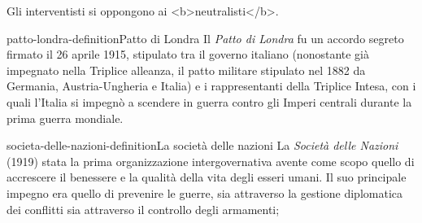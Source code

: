 \documentclass[preview]{standalone}
\begin{document}
\begin{plainhtml}
    Gli interventisti si oppongono ai <b>neutralisti</b>.
\end{plainhtml}

\begin{snippetdefinition}{patto-londra-definition}{Patto di Londra}
    Il \textit{Patto di Londra} fu un accordo segreto firmato il
    26 aprile 1915, stipulato tra il governo italiano
    (nonostante già impegnato nella Triplice alleanza,
    il patto militare stipulato nel 1882 da Germania,
    Austria-Ungheria e Italia) e i rappresentanti della Triplice Intesa,
    con i quali l'Italia si impegnò a scendere in guerra contro gli Imperi centrali
    durante la prima guerra mondiale. 
\end{snippetdefinition}

\begin{snippetdefinition}{societa-delle-nazioni-definition}{La società delle nazioni}
    La \textit{Società delle Nazioni} (1919)
    stata la prima organizzazione intergovernativa
    avente come scopo quello di accrescere il benessere
    e la qualità della vita degli esseri umani.
    Il suo principale impegno
    era quello di prevenire le guerre,
    sia attraverso la gestione diplomatica dei conflitti
    sia attraverso il controllo degli armamenti; 
\end{snippetdefinition}
\end{document}
